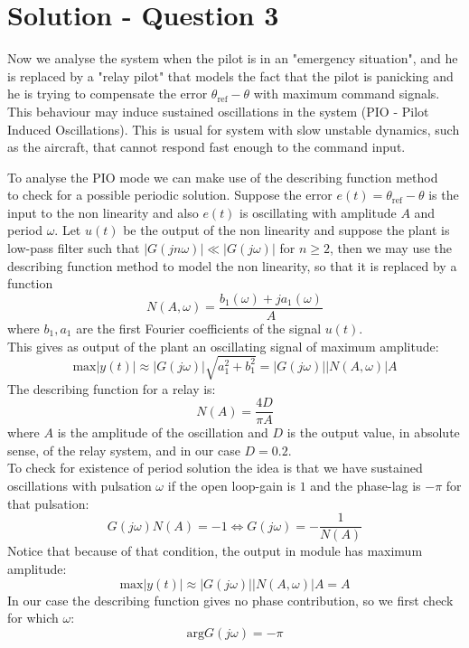 \section*{Solution - Question 3}
\label{sec:sol3}
Now we analyse the system when the pilot is in an "emergency situation", and he is replaced by a "relay pilot" that models the fact that the pilot is panicking and he is trying to compensate the error $\theta_{\text{ref}}-\theta$ with maximum command signals. This behaviour may induce sustained oscillations in the system (PIO - Pilot Induced Oscillations). This is usual for system with slow unstable dynamics, such as the aircraft, that cannot respond fast enough to the command input. 

To analyse the PIO mode we can make use of the describing function method ~\cite[p. 280]{Khalil:2002:Nonlinear-systems:vh} to check for a possible periodic solution. Suppose the error $e(t)=\theta_{\text{ref}}-\theta$ is the input to the non linearity and also $e(t)$ is oscillating with amplitude $A$ and period $\omega$. Let $u(t)$ be the output of the non linearity  and suppose the plant is low-pass filter such that $|G(jn\omega)| \ll |G(j\omega)|$ for $n \geq 2$, then we may use the describing function method to  model the non linearity, so that it is replaced by a function $$N(A,\omega)= \frac{b_1(\omega)+ja_1(\omega)}{A}$$ where $b_1,a_1$ are the first Fourier coefficients of the signal $u(t)$. \\
This gives as output of the plant an oscillating signal of maximum amplitude: $$\textrm{max}|y(t)| \approx |G(j\omega)|\sqrt{a_1^2+b_1^2}= |G(j\omega)||N(A,\omega)|A$$ 
The describing function for a relay is:
$$N(A) = \frac{4D}{\pi A}$$
where $A$ is the amplitude of the oscillation and $D$ is the output value, in absolute sense, of the relay system, and in our case $D=0.2$.\\
To check for existence of period solution the idea is that we have sustained oscillations with pulsation $\omega$ if the open loop-gain is $1$ and the  phase-lag is $-\pi$ for that pulsation:
\begin{equation}\label{eq:cond1}
G(j\omega)N(A)=-1 \Leftrightarrow G(j\omega) = -\frac{1}{N(A)}
\end{equation}
Notice that because of that condition, the output in module has maximum amplitude:
$$\textrm{max} |y(t)| \approx  |G(j\omega)||N(A,\omega)|A = A$$ 
In our case the describing function gives no phase contribution, so we first check for which $\omega $:
\begin{equation} \label{eq:cond2}
\textrm{arg}G(j\omega)=-\pi
\end{equation}

